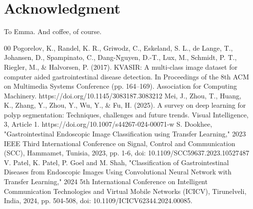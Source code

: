 \documentclass[conference]{IEEEtran}
\begin{document}
\section*{Acknowledgment}

To Emma.
And coffee, of course.


\begin{thebibliography}{00}
 Pogorelov, K., Randel, K. R., Griwodz, C., Eskeland, S. L., de Lange, T., Johansen, D., Spampinato, C., Dang-Nguyen, D.-T., Lux, M., Schmidt, P. T., Riegler, M., & Halvorsen, P. (2017). KVASIR: A multi-class image dataset for computer aided gastrointestinal disease detection. In Proceedings of the 8th ACM on Multimedia Systems Conference (pp. 164–169). Association for Computing Machinery. https://doi.org/10.1145/3083187.3083212
 Mei, J., Zhou, T., Huang, K., Zhang, Y., Zhou, Y., Wu, Y., & Fu, H. (2025). A survey on deep learning for polyp segmentation: Techniques, challenges and future trends. Visual Intelligence, 3, Article 1. https://doi.org/10.1007/s44267-024-00071-w
 S. Dookhee, "Gastrointestinal Endoscopic Image Classification using Transfer Learning," 2023 IEEE Third International Conference on Signal, Control and Communication (SCC), Hammamet, Tunisia, 2023, pp. 1-6, doi: 10.1109/SCC59637.2023.10527487
 V. Patel, K. Patel, P. Goel and M. Shah, "Classification of Gastrointestinal Diseases from Endoscopic Images Using Convolutional Neural Network with Transfer Learning," 2024 5th International Conference on Intelligent Communication Technologies and Virtual Mobile Networks (ICICV), Tirunelveli, India, 2024, pp. 504-508, doi: 10.1109/ICICV62344.2024.00085.
\end{thebibliography}
\end{document}
